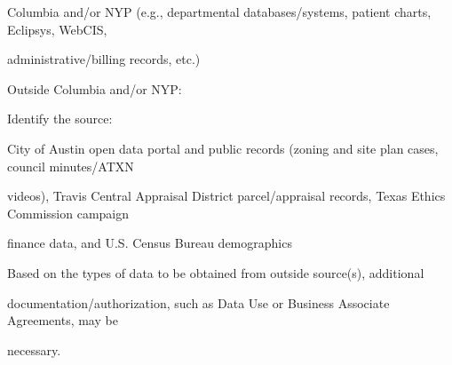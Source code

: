 \documentclass[10pt, letterpaper]{article}
\begin{document}
\noindent \makebox[0pt][l]{$\square$}\hspace{1.2em} Columbia and/or NYP (e.g., departmental databases/systems, patient charts, Eclipsys, WebCIS,

\begin{responsebox}

administrative/billing records, etc.)

\vspace{0.5em}

\vspace{0.5em}

\end{responsebox}

\noindent \makebox[0pt][l]{\color{columbiablue_official}$\boxtimes$}\hspace{1.2em} Outside Columbia and/or NYP:

\vspace{0.5em}

\vspace{0.5em}

\vspace{0.5em}

\vspace{0.5em}

\begin{responsebox}

Identify the source:

City of Austin open data portal and public records (zoning and site plan cases, council minutes/ATXN

videos), Travis Central Appraisal District parcel/appraisal records, Texas Ethics Commission campaign

finance data, and U.S. Census Bureau demographics

\vspace{0.5em}

\vspace{0.5em}

Based on the types of data to be obtained from outside source(s), additional

documentation/authorization, such as Data Use or Business Associate Agreements, may be

necessary.

\vspace{0.5em}

\vspace{0.5em}

\vspace{0.5em}

\vspace{0.5em}

\end{responsebox}
\end{document}
